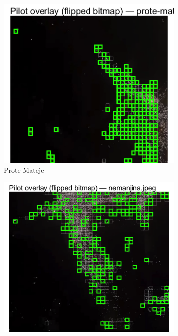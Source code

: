 \documentclass[a4paper,12pt]{article}
\begin{document}
\begin{figure}[H]
	\centering
  
	\begin{subfigure}[b]{0.3\textwidth}
	  \centering
	  \includegraphics[width=\textwidth]{../outputs/sampling_outputs/main_overlays_image/main_overlay_prote-mateje.png}
	  \caption{Prote Mateje}
	  \label{fig:prote-mateje}
	\end{subfigure}
	\hfill
	\begin{subfigure}[b]{0.3\textwidth}
	  \centering
	  \includegraphics[width=\textwidth]{../outputs/sampling_outputs/main_overlays_image/main_overlay_nemanjina.png}

\end{subfigure}
\end{figure}
\end{document}
